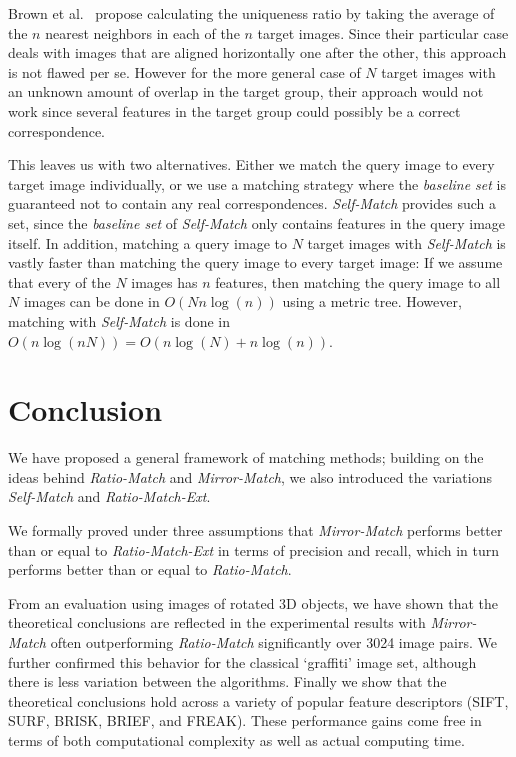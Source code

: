 \documentclass[10pt,journal,cspaper,compsoc]{IEEEtran}
\begin{document}
Brown et al.\ \cite{brown2005multi} propose calculating the uniqueness 
ratio by taking the average of the $n$ nearest neighbors in each of the 
$n$ target images. Since their particular case deals with images that 
are aligned horizontally one after the other, this approach is not 
flawed per se. However for the more general case of $N$ target images 
with an unknown amount of overlap in the target group, their approach 
would not work since several features in the target group could possibly 
be a correct correspondence. 

This leaves us with two alternatives. Either we match the query image to 
every target image individually, or we use a matching strategy where the 
\emph{baseline set} is guaranteed not to contain any real 
correspondences. \emph{Self-Match} provides such a set, since the 
\emph{baseline set} of \emph{Self-Match} only contains features in the 
query image itself. In addition, matching a query image to $N$ target 
images with \emph{Self-Match} is vastly faster than matching the query 
image to every target image: If we assume 
that every of the $N$ images has $n$ features, then matching the query 
image to all $N$ images can be done in $O(Nn\log(n))$ using a metric 
tree. However, matching with \emph{Self-Match} is done in $O(n\log(nN)) =
O(n\log(N) + n\log(n))$.

\section{Conclusion}
\label{S:Summary}

We have proposed a general framework of matching methods; building on the ideas 
behind \emph{Ratio-Match} and \emph{Mirror-Match}, we also introduced the 
variations \emph{Self-Match} and \emph{Ratio-Match-Ext}. 

We formally proved under three assumptions that \emph{Mirror-Match} 
performs better than or equal to \emph{Ratio-Match-Ext} in terms of 
precision and recall, which in turn performs better than or equal to 
\emph{Ratio-Match}.  

From an evaluation using images of rotated 3D objects, we have shown that
the theoretical conclusions are reflected in the experimental results with 
\emph{Mirror-Match} often outperforming \emph{Ratio-Match}
significantly over 3024 image pairs. We further confirmed this behavior 
for the classical `graffiti' image set, although there is less variation 
between the algorithms. Finally we show that the theoretical conclusions 
hold across a variety of popular feature descriptors (SIFT, SURF, BRISK, 
BRIEF, and FREAK).  These performance gains 
come free in terms of both computational complexity as well as actual 
computing time. 
\end{document}
